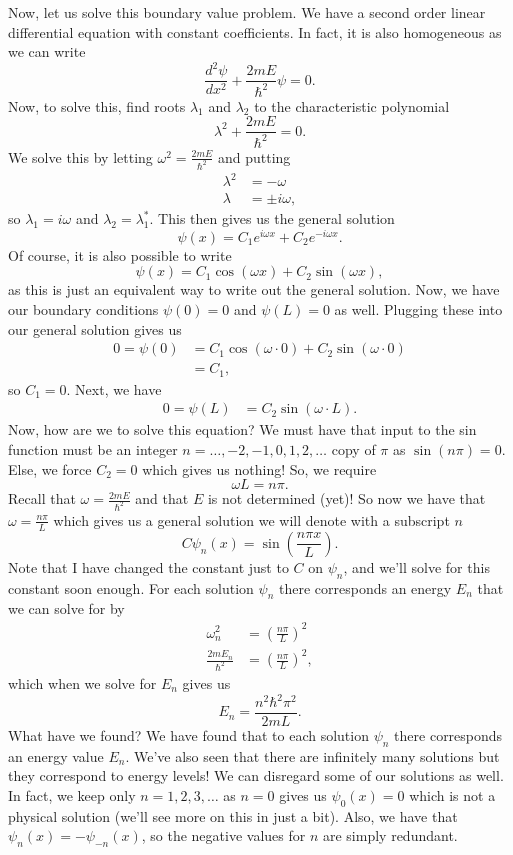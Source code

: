Now, let us solve this boundary value problem.  We have a second order linear differential equation with constant coefficients. In fact, it is also homogeneous as we can write 
\[
\frac{d^2\psi}{dx^2}+\frac{2mE}{\hbar^2}\psi =0.
\]
Now, to solve this, find roots $\lambda_1$ and $\lambda_2$ to the characteristic polynomial
\[
\lambda^2+\frac{2mE}{\hbar^2}=0.
\]
We solve this by letting $\omega^2 = \frac{2mE}{\hbar^2}$ and putting
\begin{align*}
    \lambda^2&=-\omega\\
    \lambda&=\pm i \omega,
\end{align*}
so $\lambda_1=i\omega$ and $\lambda_2=\lambda_1^*$. This then gives us the general solution
\[
\psi(x)=C_1 e^{i\omega x}+C_2 e^{-i\omega x}.
\]
Of course, it is also possible to write 
\[
\psi(x)=C_1\cos(\omega x)+C_2\sin(\omega x),
\]
as this is just an equivalent way to write out the general solution. Now, we have our boundary conditions $\psi(0)=0$ and $\psi(L)=0$ as well.  Plugging these into our general solution gives us
\begin{align*}
    0=\psi(0)&=C_1 \cos(\omega \cdot 0)+C_2 \sin(\omega \cdot 0)\\
    &= C_1,
\end{align*}
so $C_1=0$.  Next, we have
\begin{align*}
    0=\psi(L)&=C_2\sin(\omega \cdot L).
\end{align*}
Now, how are we to solve this equation? We must have that input to the sin function must be an integer $n=\dots,-2,-1,0,1,2,\dots$ copy of $\pi$ as $\sin(n\pi)=0$. Else, we force $C_2=0$ which gives us nothing!  So, we require
\[
\omega L = n\pi.
\]
Recall that $\omega = \frac{2mE}{\hbar^2}$ and that $E$ is not determined (yet)! So now we have that $\omega = \frac{n\pi}{L}$ which gives us a general solution we will denote with a subscript $n$
\[
C\psi_n(x)=\sin\left(\frac{n\pi x}{L}\right).
\]
Note that I have changed the constant just to $C$ on $\psi_n$, and we'll solve for this constant soon enough.  For each solution $\psi_n$ there corresponds an energy $E_n$ that we can solve for by
\begin{align*}
    \omega_n^2  &= \left(\frac{n \pi}{L}\right)^2\\
    \frac{2mE_n}{\hbar^2}&= \left(\frac{n\pi}{L}\right)^2,
\end{align*}
which when we solve for $E_n$ gives us
\[
   \boxed{E_n = \frac{n^2\hbar^2\pi^2}{2mL}.}
\]
What have we found? We have found that to each solution $\psi_n$ there corresponds an energy value $E_n$. We've also seen that there are infinitely many solutions but they correspond to  energy levels! We can disregard some of our solutions as well. In fact, we keep only $n=1,2,3,\dots$ as $n=0$ gives us $\psi_0(x)=0$ which is not a physical solution (we'll see more on this in just a bit).  Also, we have that $\psi_n(x)=-\psi_{-n}(x)$, so the negative values for $n$ are simply redundant.


